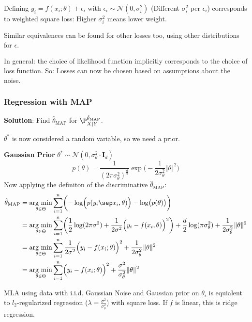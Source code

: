 {\footnotesize
    \remark Defining $y_i = f(x_i;\theta) + \epsilon_i$ with $\epsilon_i \sim \mathcal{N}(0,\sigma_i^2)$ (Different $\sigma_i^2$ per $\epsilon_i$) corresponds to weighted square loss: Higher $\sigma_i^2$ means lower weight.

    \remark Similar equivalences can be found for other losses too, using other distributions for $\epsilon$.
}

In general: the choice of likelihood function implicitly corresponds to the choice of loss function. So: Losses can now be chosen based on assumptions about the noise.

\newpage

\subsubsection{Regression with MAP}

\textbf{Solution}: Find $\hat{\theta}_\text{MAP}$ for $\P^{\hat{\theta}_\text{MAP}}_{X|Y}$.

$\theta^*$ is now considered a random variable, so we need a prior.

 \textbf{Gaussian Prior} $\theta^* \sim \mathcal{N}(0,\sigma^2_\theta \cdot \mathbf{I}_d)$
$$
    p(\theta) = \frac{1}{(2\pi\sigma_\theta^2)^{\frac{d}{2}}}\exp\biggl( -\frac{1}{2\sigma_\theta^2}\Vert \theta \Vert^2 \biggr)
$$
Now applying the definiton of the discriminative $\hat{\theta}_\text{MAP}$:
{\scriptsize
\begin{align*}
    \hat{\theta}_\text{MAP} &= \underset{\theta\in\Theta}{\text{arg min}} \sum_{i=1}^{n} \biggl( -\log\Bigl( p(y_i \sep x_i, \theta) \Bigr) - \log\bigl(p(\theta)\bigr) \biggr) \\
                            &= \underset{\theta\in\Theta}{\text{arg min}} \sum_{i=1}^{n} \biggl( \frac{1}{2}\log(2\pi\sigma^2)+\frac{1}{2\sigma^2}\Bigl( y_i - f(x_i,\theta) \Bigr)^2 \biggr) + \frac{d}{2}\log(\pi\sigma_\theta^2) + \frac{1}{2\sigma_\theta^2}\Vert\theta\Vert^2 \\
                            &= \underset{\theta\in\Theta}{\text{arg min}} \sum_{i=1}^{n} \frac{1}{2\sigma^2}\Bigl( y_i-f(x_i;\theta) \Bigr)^2 + \frac{1}{2\sigma_\theta^2}\Vert\theta\Vert^2 \\
                            &= \underset{\theta\in\Theta}{\text{arg min}} \sum_{i=1}^{n} \Bigl( y_i - f(x_i;\theta) \Bigr)^2 + \frac{\sigma^2}{\sigma_\theta^2}\Vert\theta\Vert^2
\end{align*}
}

MLA using data with i.i.d. Gaussian Noise and Gaussian prior on $\theta_i$ is equialent to $l_2$-regularized regression ($\lambda = \frac{\sigma^2}{\sigma_\theta^2}$) with square loss. If $f$ is linear, this is ridge regression.

